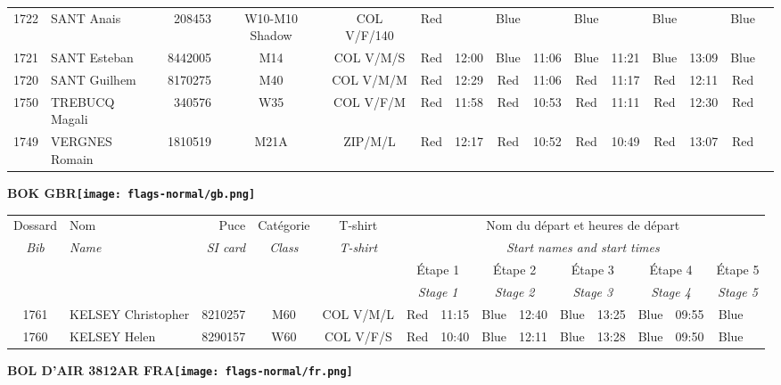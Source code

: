 \documentclass{report}
\begin{document}
\begin{longtable}{|c|l|r|c|c|*{5}{cc|}}
    1722 & SANT Anais & 208453 & W10-M10 Shadow & COL V/F/140 & Red &   & Blue &   & Blue &   & Blue &   & Blue &  \\
    1721 & SANT Esteban & 8442005 & M14 & COL V/M/S & Red & 12:00 & Blue & 11:06 & Blue & 11:21 & Blue & 13:09 & Blue &  \\
    1720 & SANT Guilhem & 8170275 & M40 & COL V/M/M & Red & 12:29 & Red & 11:06 & Red & 11:17 & Red & 12:11 & Red &  \\
    1750 & TREBUCQ Magali & 340576 & W35 & COL V/F/M & Red & 11:58 & Red & 10:53 & Red & 11:11 & Red & 12:30 & Red &  \\
    1749 & VERGNES Romain & 1810519 & M21A & ZIP/M/L & Red & 12:17 & Red & 10:52 & Red & 10:49 & Red & 13:07 & Red &  \\
  \end{longtable}
\newpage
  \Huge \centering \bfseries BOK  GBR\normalfont \footnotesize \sffamily \hfill \texttt{[image: flags-normal/gb.png]} \newline 
  \begin{longtable}{|c|l|r|c|c|*{5}{cc|}}
    Dossard & Nom  & Puce    & Catégorie & T-shirt & \multicolumn{10}{c|}{Nom du départ et heures de départ} \\
    \itshape Bib     & \itshape Name & \itshape SI card & \itshape Class  & \itshape  T-shirt  & \multicolumn{10}{c|}{\itshape Start names and start times} \\
    \hline
    & & & & & \multicolumn{2}{c|}{Étape 1} & \multicolumn{2}{c|}{Étape 2} & \multicolumn{2}{c|}{Étape 3} & \multicolumn{2}{c|}{Étape 4} & \multicolumn{2}{c|}{Étape 5} \\
    & & & & & \multicolumn{2}{c|}{\itshape Stage 1} & \multicolumn{2}{c|}{\itshape Stage 2} & \multicolumn{2}{c|}{\itshape Stage 3} & \multicolumn{2}{c|}{\itshape Stage 4} & \multicolumn{2}{c|}{\itshape Stage 5} \\
    \hline
    1761 & KELSEY Christopher & 8210257 & M60 & COL V/M/L & Red & 11:15 & Blue & 12:40 & Blue & 13:25 & Blue & 09:55 & Blue &  \\
    1760 & KELSEY Helen & 8290157 & W60 & COL V/F/S & Red & 10:40 & Blue & 12:11 & Blue & 13:28 & Blue & 09:50 & Blue &  \\
  \end{longtable}
\newpage
  \Huge \centering \bfseries BOL D'AIR 3812AR FRA\normalfont \footnotesize \sffamily \hfill \texttt{[image: flags-normal/fr.png]} \newline 
\end{document}
